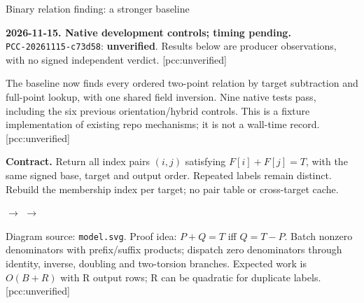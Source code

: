 \documentclass[10pt]{article}
\begin{document}
\begin{center}\LARGE Binary relation finding: a stronger baseline\end{center}
\textbf{2026-11-15. Native development controls; timing pending.}\\
\texttt{PCC-20261115-c73d58}: \textbf{unverified}. Results below are producer observations, with no signed independent verdict. [pcc:unverified]

The baseline now finds every ordered two-point relation by target subtraction and full-point lookup, with one shared field inversion. Nine native tests pass, including the six previous orientation/hybrid controls. This is a fixture implementation of existing repo mechanisms; it is not a wall-time record. [pcc:unverified]

\textbf{Contract.} Return all index pairs $(i,j)$ satisfying $F[i]+F[j]=T$, with the same signed base, target and output order. Repeated labels remain distinct. Rebuild the membership index per target; no pair table or cross-target cache.

\begin{center}
$\to$
$\to$
\end{center}
Diagram source: \texttt{model.svg}. Proof idea: $P+Q=T$ iff $Q=T-P$. Batch nonzero denominators with prefix/suffix products; dispatch zero denominators through identity, inverse, doubling and two-torsion branches. Expected work is $O(B+R)$ with R output rows; R can be quadratic for duplicate labels. [pcc:unverified]
\end{document}
